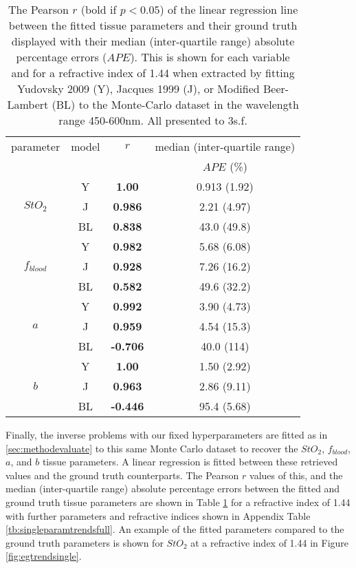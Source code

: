 \begin{table}[htpb]
    \centering
    \caption{The  Pearson $r$ (bold if $p<0.05$) of the linear regression line between the fitted tissue parameters and their ground truth displayed with their median (inter-quartile range) absolute percentage errors ($APE$). This is shown for each variable and for a refractive index of 1.44 when extracted by fitting Yudovsky 2009 (Y), Jacques 1999 (J), or Modified Beer-Lambert (BL) to the Monte-Carlo dataset in the wavelength range 450-600nm. All presented to 3s.f.}
    \begin{tabular}{|cc|cc|}
        \hline
        parameter & model & $r$ & median (inter-quartile range) \\
        & &  & $APE$ (\%)\\
        \hline
        \multirow{3}{*}{$StO_2$} & Y & \textbf{1.00} & 0.913 (1.92) \\
        & J & \textbf{0.986} & 2.21 (4.97) \\
        & BL & \textbf{0.838} & 43.0 (49.8) \\
        \hline
        \multirow{3}{*}{$f_{blood}$} & Y & \textbf{0.982} & 5.68 (6.08) \\
        & J & \textbf{0.928} & 7.26 (16.2) \\
        & BL & \textbf{0.582} & 49.6 (32.2) \\
        \hline
        \multirow{3}{*}{$a$} & Y & \textbf{0.992} & 3.90 (4.73) \\
        & J & \textbf{0.959} & 4.54 (15.3) \\
        & BL & \textbf{-0.706} & 40.0 (114) \\
        \hline
        \multirow{3}{*}{$b$} & Y & \textbf{1.00} & 1.50 (2.92) \\
        & J & \textbf{0.963} & 2.86 (9.11) \\
        & BL & \textbf{-0.446} & 95.4 (5.68) \\
        \hline
    \end{tabular}
    \label{tb:singleparamtrends}
\end{table}

Finally, the inverse problems with our fixed hyperparameters are fitted as in \ref{sec:methodevaluate} to this same Monte Carlo dataset to recover the $StO_2$, $f_{blood}$, $a$, and $b$ tissue parameters. A linear regression is fitted between these retrieved values and the ground truth counterparts. The Pearson $r$ values of this, and the median (inter-quartile range) absolute percentage errors between the fitted and ground truth tissue parameters are shown in Table \ref{tb:singleparamtrends} for a refractive index of 1.44 with further parameters and refractive indices shown in Appendix Table \ref{tb:singleparamtrendsfull}. An example of the fitted parameters compared to the ground truth parameters is shown for $StO_2$ at a refractive index of 1.44 in Figure \ref{fig:egtrendsingle}. 



